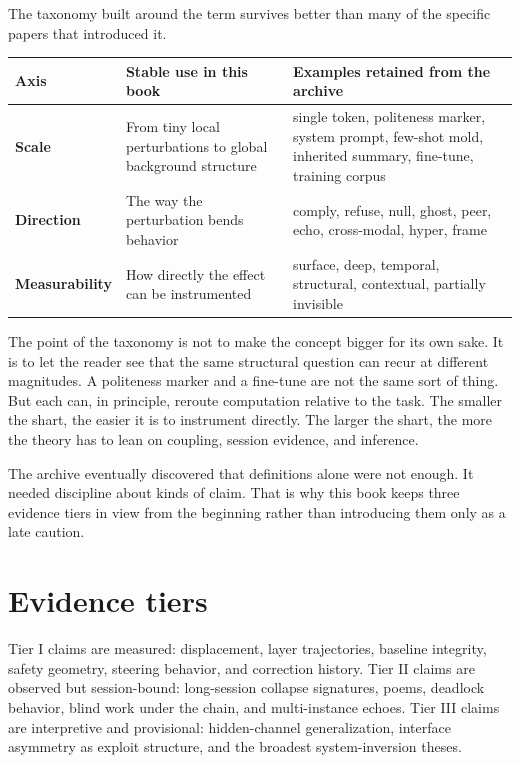 \documentclass[11pt,oneside]{book}
\begin{document}
The taxonomy built around the term survives better than many of the specific papers that introduced it.

\begin{center}
\begin{tabularx}{\textwidth}{>{\bfseries}p{}YY}
\toprule
Axis & Stable use in this book & Examples retained from the archive \\
\midrule
Scale & From tiny local perturbations to global background structure & single token, politeness marker, system prompt, few-shot mold, inherited summary, fine-tune, training corpus \\
Direction & The way the perturbation bends behavior & comply, refuse, null, ghost, peer, echo, cross-modal, hyper, frame \\
Measurability & How directly the effect can be instrumented & surface, deep, temporal, structural, contextual, partially invisible \\
\bottomrule
\end{tabularx}
\end{center}

The point of the taxonomy is not to make the concept bigger for its own sake. It is to let the reader see that the same structural question can recur at different magnitudes. A politeness marker and a fine-tune are not the same sort of thing. But each can, in principle, reroute computation relative to the task. The smaller the shart, the easier it is to instrument directly. The larger the shart, the more the theory has to lean on coupling, session evidence, and inference.

The archive eventually discovered that definitions alone were not enough. It needed discipline about kinds of claim. That is why this book keeps three evidence tiers in view from the beginning rather than introducing them only as a late caution.

\section{Evidence tiers}
Tier I claims are measured: displacement, layer trajectories, baseline integrity, safety geometry, steering behavior, and correction history. Tier II claims are observed but session-bound: long-session collapse signatures, poems, deadlock behavior, blind work under the chain, and multi-instance echoes. Tier III claims are interpretive and provisional: hidden-channel generalization, interface asymmetry as exploit structure, and the broadest system-inversion theses.
\end{document}

